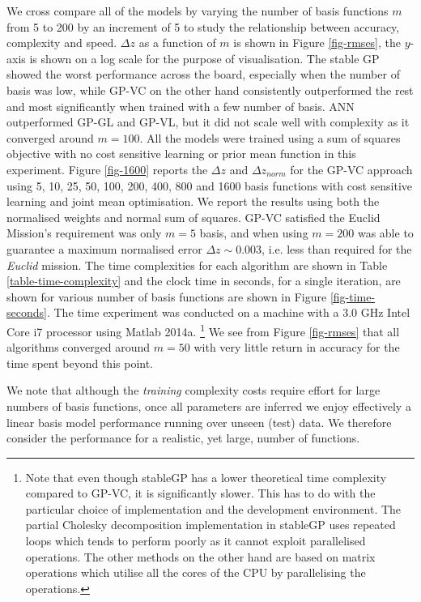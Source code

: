 \documentclass[useAMS,usenatbib,fleqn]{mn2e}
\begin{document}
We cross compare all of the models by varying the number of basis functions $m$ from 5 to 200 by an increment of 5 to study the relationship between accuracy, complexity and speed. $\Delta z$ as a function of $m$ is shown in Figure \ref{fig-rmses}, the $y$-axis is shown on a log scale for the purpose of visualisation. The stable GP showed the worst performance across the board, especially when the number of basis was low, while GP-VC on the other hand consistently outperformed the rest and most significantly when trained with a few number of basis. ANN outperformed GP-GL and GP-VL, but it did not scale well with complexity as it converged around $m=100$. All the models were trained using a sum of squares objective with no cost sensitive learning or prior mean function in this experiment. Figure \ref{fig-1600} reports the $\Delta z$ and $\Delta z_{norm}$ for the GP-VC approach using 5, 10, 25, 50, 100, 200, 400, 800 and 1600 basis functions with cost sensitive learning and joint mean optimisation. We report the results using both the normalised weights and normal sum of squares. GP-VC satisfied the Euclid Mission's requirement was only $m=5$ basis, and when using $m=200$ was able to guarantee  a maximum normalised error $\Delta z \sim 0.003$, i.e. less than required for the {\em Euclid} mission. The  time complexities for each algorithm are shown in Table \ref{table-time-complexity} and the clock time in seconds, for a single iteration, are shown for various number of basis functions are shown in Figure \ref{fig-time-seconds}. The time experiment was conducted on a machine with a 3.0 GHz Intel Core i7 processor using Matlab 2014a. \footnote{Note that even though stableGP has a lower theoretical time complexity compared to GP-VC, it is significantly slower. This has to do with the particular choice of implementation and the development environment. The partial Cholesky decomposition implementation in stableGP \citep{stableGP} uses repeated loops which tends to perform poorly as it cannot exploit parallelised operations. The other methods on the other hand are based on matrix operations which utilise all the cores of the CPU by parallelising the operations.} We see from Figure \ref{fig-rmses} that all algorithms converged around $m=50$ with very little return in accuracy for the time spent beyond this point.

We note that although the \emph{training} complexity costs require effort for large numbers of basis functions, once all parameters are inferred we enjoy effectively a linear basis model performance running over unseen (test) data. We therefore consider the performance for a realistic, yet large, number of functions. 
\end{document}
